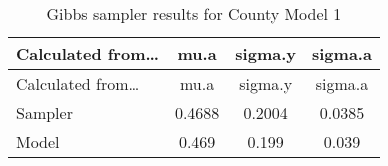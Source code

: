 \documentclass[12pt,twoside]{reedthesis}
\begin{document}
  \begin{longtable}[]{@{}lccc@{}}
  \caption{Gibbs sampler results for County Model 1
  \label{tab:gibbs_1}}\tabularnewline
  \toprule
  \begin{minipage}[b]{0.26\columnwidth}\raggedright\strut
  Calculated from\ldots{}\strut
  \end{minipage} & \begin{minipage}[b]{0.11\columnwidth}\centering\strut
  mu.a\strut
  \end{minipage} & \begin{minipage}[b]{0.12\columnwidth}\centering\strut
  sigma.y\strut
  \end{minipage} & \begin{minipage}[b]{0.12\columnwidth}\centering\strut
  sigma.a\strut
  \end{minipage}\tabularnewline
  \midrule
  \endfirsthead
  \toprule
  \begin{minipage}[b]{0.26\columnwidth}\raggedright\strut
  Calculated from\ldots{}\strut
  \end{minipage} & \begin{minipage}[b]{0.11\columnwidth}\centering\strut
  mu.a\strut
  \end{minipage} & \begin{minipage}[b]{0.12\columnwidth}\centering\strut
  sigma.y\strut
  \end{minipage} & \begin{minipage}[b]{0.12\columnwidth}\centering\strut
  sigma.a\strut
  \end{minipage}\tabularnewline
  \midrule
  \endhead
  \begin{minipage}[t]{0.26\columnwidth}\raggedright\strut
  Sampler\strut
  \end{minipage} & \begin{minipage}[t]{0.11\columnwidth}\centering\strut
  0.4688\strut
  \end{minipage} & \begin{minipage}[t]{0.12\columnwidth}\centering\strut
  0.2004\strut
  \end{minipage} & \begin{minipage}[t]{0.12\columnwidth}\centering\strut
  0.0385\strut
  \end{minipage}\tabularnewline
  \begin{minipage}[t]{0.26\columnwidth}\raggedright\strut
  Model\strut
  \end{minipage} & \begin{minipage}[t]{0.11\columnwidth}\centering\strut
  0.469\strut
  \end{minipage} & \begin{minipage}[t]{0.12\columnwidth}\centering\strut
  0.199\strut
  \end{minipage} & \begin{minipage}[t]{0.12\columnwidth}\centering\strut
  0.039\strut
  \end{minipage}\tabularnewline
  \bottomrule
  \end{longtable}
  
\end{document}
